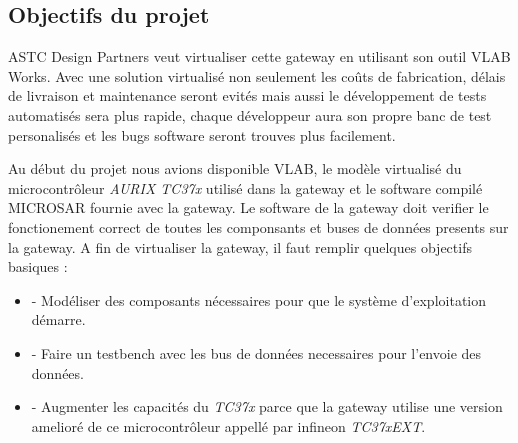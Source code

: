 \subsection{Objectifs du projet}

ASTC Design Partners veut virtualiser cette gateway en utilisant son outil VLAB Works. Avec une solution virtualis\'e non seulement les coûts de fabrication, délais de livraison et maintenance seront evit\'es mais aussi le développement de tests automatis\'es sera plus rapide, chaque développeur aura son propre banc de test personalis\'es et les bugs software seront trouves plus facilement. 


Au début du projet nous avions disponible VLAB, le mod\`ele virtualis\'e du microcontr\^oleur \textit{AURIX TC37x} utilis\'e dans la gateway et le software compil\'e MICROSAR fournie avec la gateway. Le software de la gateway doit verifier le fonctionement correct de toutes les componsants et buses de donn\'ees presents sur la gateway. A fin de virtualiser la gateway, il faut remplir quelques objectifs basiques : 
\begin{itemize}
    \item - Modéliser des composants nécessaires pour que le syst\`eme d'exploitation démarre.
    \item - Faire un testbench avec les bus de donn\'ees necessaires pour l'envoie des donn\'ees.
    \item - Augmenter les capacit\'es du \textit{TC37x} parce que la gateway utilise une version amelior\'e de ce microcontr\^oleur appell\'e par infineon \textit{TC37xEXT}\cite{aurix.tc37e}.
\end{itemize}